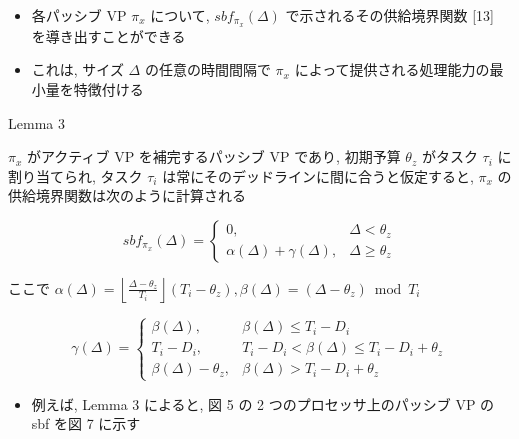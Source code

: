 \begin{frame}{}
    \begin{itemize}
        \item 各パッシブ VP $\pi_{x}$ について, $s b f_{\pi_{x}}(\Delta)$ で示されるその供給境界関数 [13] を導き出すことができる
\item これは, サイズ $\Delta$ の任意の時間間隔で $\pi_{x}$ によって提供される処理能力の最小量を特徴付ける
    \end{itemize}
\end{frame}

\begin{frame}[label=lemma3]{Lemma 3}
    \begin{lemma}[]
        $\pi_{x}$ がアクティブ VP を補完するパッシブ VP であり, 初期予算 $\theta_{z}$ がタスク $\tau_{i}$ に割り当てられ, タスク $\tau_{i}$ は常にそのデッドラインに間に合うと仮定すると, $\pi_{x}$ の供給境界関数は次のように計算される

        \begin{equation*}
            s b f_{\pi_{x}}(\Delta)= \begin{cases}0, & \Delta<\theta_{z} \\ \alpha(\Delta)+\gamma(\Delta), & \Delta \geq \theta_{z}\end{cases}
        \end{equation*}

        ここで $\alpha(\Delta)=\left\lfloor\frac{\Delta-\theta_{z}}{T_{i}}\right\rfloor\left(T_{i}-\theta_{z}\right), \beta(\Delta)=\left(\Delta-\theta_{z}\right) \bmod T_{i}$

        \begin{equation*}
            \gamma(\Delta)=\left\{\begin{array}{lr}
                \beta(\Delta),            & \beta(\Delta) \leq T_{i}-D_{i}                        \\
                T_{i}-D_{i},              & T_{i}-D_{i}<\beta(\Delta) \leq T_{i}-D_{i}+\theta_{z} \\
                \beta(\Delta)-\theta_{z}, & \beta(\Delta)>T_{i}-D_{i}+\theta_{z}
            \end{array}\right.
        \end{equation*}
    \end{lemma}
\end{frame}

\begin{frame}{}
    \begin{itemize}
        \item 例えば, Lemma 3 によると, 図 5 の 2 つのプロセッサ上のパッシブ VP の sbf を図 7 に示す
    \end{itemize}
\end{frame}

